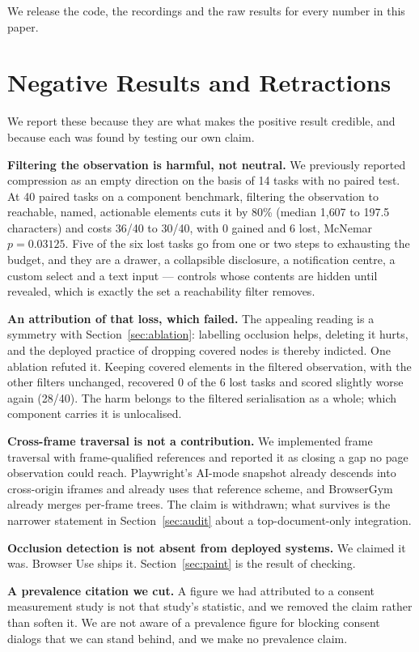 \documentclass[conference]{IEEEtran}
\begin{document}
We release the code, the recordings and the raw results for every number in
this paper.

\section{Negative Results and Retractions}
\label{sec:negative}

We report these because they are what makes the positive result credible, and
because each was found by testing our own claim.

\textbf{Filtering the observation is harmful, not neutral.} We previously
reported compression as an empty direction on the basis of 14 tasks with no
paired test. At 40 paired tasks on a component benchmark, filtering the
observation to reachable, named, actionable elements cuts it by 80\% (median
1{,}607 to 197.5 characters) and costs 36/40 to 30/40, with 0 gained and 6
lost, McNemar $p = 0.03125$. Five of the six lost tasks go from one or two
steps to exhausting the budget, and they are a drawer, a collapsible
disclosure, a notification centre, a custom select and a text input --- controls
whose contents are hidden until revealed, which is exactly the set a
reachability filter removes.

\textbf{An attribution of that loss, which failed.} The appealing reading is a
symmetry with Section~\ref{sec:ablation}: labelling occlusion helps, deleting
it hurts, and the deployed practice of dropping covered nodes is thereby
indicted. One ablation refuted it. Keeping covered elements in the filtered
observation, with the other filters unchanged, recovered 0 of the 6 lost tasks
and scored slightly worse again (28/40). The harm belongs to the filtered
serialisation as a whole; which component carries it is unlocalised.

\textbf{Cross-frame traversal is not a contribution.} We implemented frame
traversal with frame-qualified references and reported it as closing a gap no
page observation could reach. Playwright's AI-mode snapshot already descends
into cross-origin iframes and already uses that reference scheme, and
BrowserGym already merges per-frame trees. The claim is withdrawn; what survives
is the narrower statement in Section~\ref{sec:audit} about a top-document-only
integration.

\textbf{Occlusion detection is not absent from deployed systems.} We claimed it
was. Browser Use ships it. Section~\ref{sec:paint} is the result of checking.

\textbf{A prevalence citation we cut.} A figure we had attributed to a consent
measurement study is not that study's statistic, and we removed the claim
rather than soften it. We are not aware of a prevalence figure for blocking
consent dialogs that we can stand behind, and we make no prevalence claim.
\end{document}
